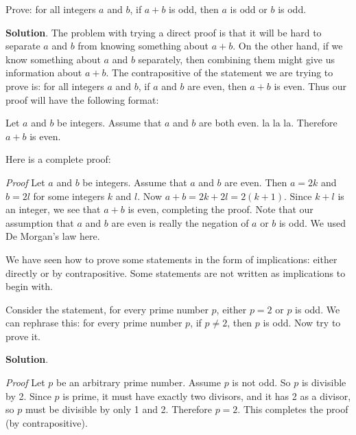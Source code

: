 \documentclass[11pt,]{book}
\makeatletter
\theoremstyle{ptxplainnotitle}
\theoremstyle{ptxplaintitle}
\renewcommand*{\proofname}{Proof}
\renewenvironment{proof}[1][\proofname]{\par
  \pushQED{\qed}%
  \normalfont \topsep6\p@\@plus6\p@\relax
  \trivlist
  \item\relax
    {\itshape
    #1\@addpunct{.}}\hspace\labelsep\ignorespaces
}{%
  \popQED\endtrivlist\@endpefalse
}
\theoremstyle{ptxdefinitionnotitle}
\theoremstyle{ptxdefinitiontitle}
\theoremstyle{ptxdefinitionnotitle}
\theoremstyle{ptxdefinitiontitle}
\theoremstyle{ptxdefinitionnotitle}
\theoremstyle{ptxdefinitiontitle}
\theoremstyle{ptxdefinitiontitlenonumber}
\theoremstyle{ptxdefinitiontitlenonumber}
\numberwithin{equation}{chapter}
\makeatother
\begin{document}
\begin{example}\label{example-66}
\hypertarget{p-2559}{}%
Prove: for all integers \(a\) and \(b\), if \(a + b\) is odd, then \(a\) is odd or \(b\) is odd.%
\par\smallskip%
\noindent\textbf{Solution}.\hypertarget{solution-290}{}\quad%
\hypertarget{p-2560}{}%
The problem with trying a direct proof is that it will be hard to separate \(a\) and \(b\) from knowing something about \(a+b\). On the other hand, if we know something about \(a\) and \(b\) separately, then combining them might give us information about \(a+b\). The contrapositive of the statement we are trying to prove is: for all integers \(a\) and \(b\), if \(a\) and \(b\) are even, then \(a+b\) is even. Thus our proof will have the following format:%
\par
\hypertarget{p-2561}{}%
Let \(a\) and \(b\) be integers. Assume that \(a\) and \(b\) are both even. la la la. Therefore \(a+b\) is even.%
\par
\hypertarget{p-2562}{}%
Here is a complete proof:%
\begin{proof}\hypertarget{proof-28}{}
\hypertarget{p-2563}{}%
Let \(a\) and \(b\) be integers. Assume that \(a\) and \(b\) are even. Then \(a = 2k\) and \(b = 2l\) for some integers \(k\) and \(l\). Now \(a + b = 2k + 2l = 2(k+1)\). Since \(k + l\) is an integer, we see that \(a + b\) is even, completing the proof.%
\end{proof}
\hypertarget{p-2564}{}%
Note that our assumption that \(a\) and \(b\) are even is really the negation of \(a\) or \(b\) is odd. We used De Morgan's law here.%
\end{example}
\hypertarget{p-2565}{}%
We have seen how to prove some statements in the form of implications: either directly or by contrapositive. Some statements are not written as implications to begin with.%
\begin{example}\label{example-67}
\hypertarget{p-2566}{}%
Consider the statement, for every prime number \(p\), either \(p = 2\) or \(p\) is odd. We can rephrase this: for every prime number \(p\), if \(p \ne 2\), then \(p\) is odd. Now try to prove it.%
\par\smallskip%
\noindent\textbf{Solution}.\hypertarget{solution-291}{}\quad%
\begin{proof}\hypertarget{proof-29}{}
\hypertarget{p-2567}{}%
Let \(p\) be an arbitrary prime number. Assume \(p\) is not odd. So \(p\) is divisible by 2. Since \(p\) is prime, it must have exactly two divisors, and it has 2 as a divisor, so \(p\) must be divisible by only 1 and 2. Therefore \(p = 2\). This completes the proof (by contrapositive).%
\end{proof}
\end{example}
\typeout{************************************************}
\typeout{************************************************}
\end{document}

